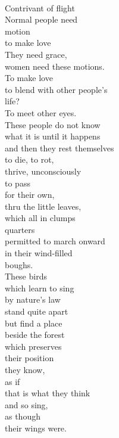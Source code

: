 \documentclass[smalldemyvopaper,11pt,twoside,onecolumn,openright,extrafontsizes]{memoir}
\begin{document}
\\Contrivant of flight
\\Normal people need
\\motion
\\to make love
\\They need grace,
\\women need these motions.
\\To make love
\\to blend with other people's
\\life?
\\To meet other eyes.
\\These people do not know
\\what it is until it happens
\\and then they rest themselves
\\to die, to rot,
\\thrive, unconsciously
\\to pass
\\for their own,
\\thru the little leaves,
\\which all in clumps
\\quarters
\\permitted to march onward
\\in their wind-filled
\\boughs.
\\These birds
\\which learn to sing
\\by nature's law
\\stand quite apart
\\but find a place
\\beside the forest
\\which preserves
\\their position
\\they know,
\\as if
\\that is what they think
\\and so sing,
\\as though
\\their wings were.
\end{document}
